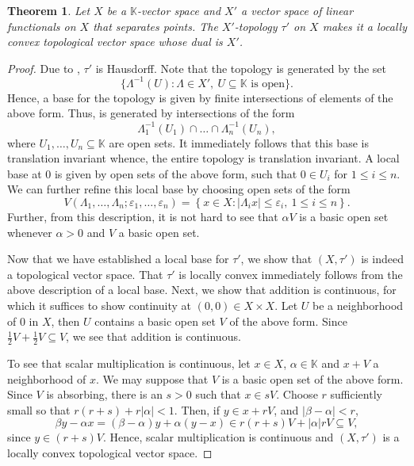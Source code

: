 \documentclass[12pt]{article}
\theoremstyle{thmstyle}
\newtheorem{theorem}{Theorem}[section]
\theoremstyle{defstyle}
\newcommand{\R}{\mathbb{R}}
\newcommand{\bbC}{\mathbb{C}}
\newcommand{\K}{\mathbb{K}} %
\renewcommand{\le}{\leqslant}
\begin{document}
\begin{theorem}
    Let $X$ be a $\K$-vector space and $X'$ a vector space of linear functionals on $X$ that separates points. The $X'$-topology $\tau'$ on $X$ makes it a locally convex topological vector space whose dual is $X'$.
\end{theorem}
\begin{proof}
    Due to , $\tau'$ is Hausdorff. Note that the topology is generated by the set 
    \begin{equation*}
        \{\Lambda^{-1}(U)\colon\Lambda\in X',~U\subseteq\K\text{ is open}\}.
    \end{equation*}
    Hence, a base for the topology is given by finite intersections of elements of the above form. Thus, is generated by intersections of the form 
    \begin{equation*}
        \Lambda_1^{-1}(U_1)\cap\dots\cap\Lambda_n^{-1}(U_n),
    \end{equation*}
    where $U_1,\dots,U_n\subseteq\K$ are open sets. It immediately follows that this base is translation invariant whence, the entire topology is translation invariant. A local base at $0$ is given by open sets of the above form, such that $0\in U_i$ for $1\le i\le n$. We can further refine this local base by choosing open sets of the form 
    \begin{equation*}
        V(\Lambda_1,\dots,\Lambda_n; \varepsilon_1,\dots,\varepsilon_n) = \left\{x\in X\colon|\Lambda_i x|\le \varepsilon_i,~1\le i\le n\right\}.
    \end{equation*}
    Further, from this description, it is not hard to see that $\alpha V$ is a basic open set whenever $\alpha > 0$ and $V$ a basic open set.

    Now that we have established a local base for $\tau'$, we show that $(X, \tau')$ is indeed a topological vector space. That $\tau'$ is locally convex immediately follows from the above description of a local base. Next, we show that addition is continuous, for which it suffices to show continuity at $(0, 0)\in X\times X$. Let $U$ be a neighborhood of $0$ in $X$, then $U$ contains a basic open set $V$ of the above form. Since $\frac{1}{2}V + \frac{1}{2}V\subseteq V$, we see that addition is continuous.

    To see that scalar multiplication is continuous, let $x\in X$, $\alpha\in\K$ and $x + V$ a neighborhood of $x$. We may suppose that $V$ is a basic open set of the above form. Since $V$ is absorbing, there is an $s > 0$ such that $x\in sV$. Choose $r$ sufficiently small so that $r(r + s) + r|\alpha| < 1$. Then, if $y\in x + rV$, and $|\beta - \alpha| < r$,
    \begin{equation*}
        \beta y - \alpha x = (\beta - \alpha)y + \alpha(y - x)\in r(r + s)V + |\alpha|rV\subseteq V,
    \end{equation*}
    since $y\in (r + s)V$. Hence, scalar multiplication is continuous and $(X, \tau')$ is a locally convex topological vector space. 


\end{proof}
\end{document}
